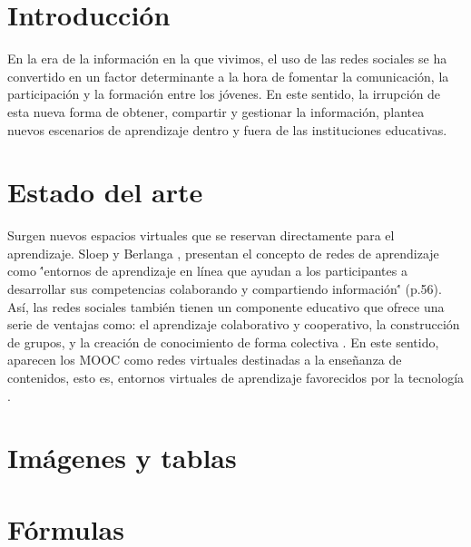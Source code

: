 \documentclass[12pt]{article}
\begin{document}
\maketitle

\begin{abstract}
Este trabajo tiene como objeto de estudio comprender la influencia de las interacciones entre los escenarios escolares y virtuales en los procesos de aprendizaje. As\'i pues, se ha llevado a cabo un estudio de caso de un alumno de ESO (Educaci\'on Secundaria Obligatoria) de 15 años de edad. Como herramientas de recogida de informaci\'on hemos utilizado las entrevistas en profundidad. Los resultados muestran el gran potencial que tienen las redes sociales para desarrollar el aprendizaje, la identidad y el capital social en los adolescentes.\\\\
Enlace al repositorio: \url{https://github.com/jmiguel22/proyecto_final.git}\\\\
\textbf{Palabras clave:} Aprendizaje, Redes sociales

\end{abstract}

\section{Introducci\'on}
En la era de la informaci\'on en la que vivimos, el uso de las redes sociales se ha convertido en un factor determinante a la hora de fomentar la comunicaci\'on, la participaci\'on y la formaci\'on entre los j\'ovenes. En este sentido, la irrupci\'on de esta nueva forma de obtener, compartir y gestionar la informaci\'on, plantea nuevos escenarios de aprendizaje dentro y fuera de las instituciones educativas. 

\section{Estado del arte}
Surgen nuevos espacios virtuales que se reservan directamente para el aprendizaje. Sloep y Berlanga \cite{sloep_learning_2011}, presentan el concepto de redes de aprendizaje como \''entornos de aprendizaje en l\'inea que ayudan a los participantes a desarrollar sus competencias colaborando y compartiendo informaci\'on\'' (p.56). As\'i, las redes sociales tambi\'en tienen un componente educativo que ofrece una serie de ventajas como: el aprendizaje colaborativo y cooperativo, la construcci\'on de grupos, y la creaci\'on de conocimiento de forma colectiva \cite{ortega_espacios_2008}. En este sentido, aparecen los MOOC como redes virtuales destinadas a la enseñanza de contenidos, esto es, entornos virtuales de aprendizaje favorecidos por la tecnolog\'ia \cite{bartolome-pina_are_2015}.

\section{Im\'agenes y tablas}

\section{F\'ormulas}



\end{document}
